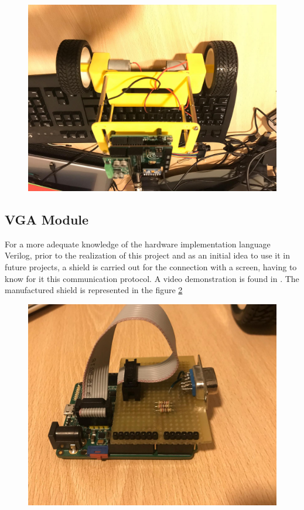 \begin{center}
	\begin{figure}[H]
		\center
		\includegraphics[scale=0.2, angle=180]{imagenes/Balancing_Robot/test2}
		\caption{}
		\label{fig:test2}
	\end{figure}
\end{center}

\subsection{VGA Module}
For a more adequate knowledge of the hardware implementation language Verilog, prior to the realization of this project and as an initial idea to use it in future projects, a shield is carried out for the connection with a screen, having to know for it this communication protocol. A video demonstration is found in \cite{vga}. \newline
The manufactured shield is represented in the figure \ref{fig:vga}

\begin{center}
	\begin{figure}[H]
		\center
		\includegraphics[scale=0.2]{imagenes/Balancing_Robot/vga}
		\caption{}
		\label{fig:vga}
	\end{figure}
\end{center}
